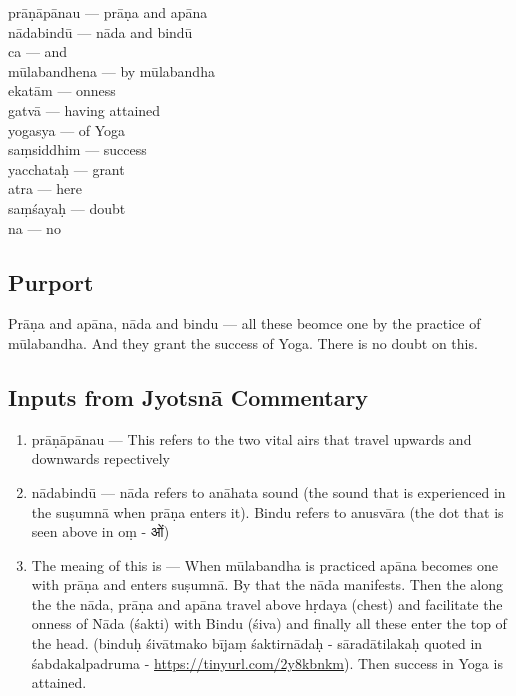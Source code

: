 \begin{multicols}{2}
prāṇāpānau ---  prāṇa and apāna \\
nādabindū --- nāda and bindū\\
ca --- and \\
mūlabandhena --- by mūlabandha \\
ekatām --- onness \\
gatvā --- having attained \\
yogasya --- of Yoga \\
saṃsiddhim --- success \\
yacchataḥ --- grant \\
atra --- here \\
saṃśayaḥ --- doubt \\
na --- no
\end{multicols}

\subsection*{Purport}

Prāṇa and apāna, nāda and bindu --- all these beomce one by the practice of mūlabandha. And they grant the success of Yoga. There is no doubt on this. 

\subsection*{Inputs from Jyotsnā Commentary}

\begin{enumerate}
\item prāṇāpānau --- This refers to the two vital airs that travel upwards and downwards repectively 
\item nādabindū --- nāda refers to anāhata sound (the sound that is experienced in the suṣumnā when prāṇa enters it). Bindu refers to anusvāra (the dot that is seen above in oṃ - ओं)
\item The meaing of this is --- When mūlabandha is practiced apāna becomes one with prāṇa and enters suṣumnā. By that the nāda manifests. Then the along the the nāda, prāṇa and apāna travel above hṛdaya (chest) and facilitate the onness of Nāda (śakti) with Bindu (śiva) and finally all these enter the top of the head. (binduḥ śivātmako bījaṃ śaktirnādaḥ - sāradātilakaḥ quoted in śabdakalpadruma - \url{https://tinyurl.com/2y8kbnkm}). Then success in Yoga is attained.  
\end{enumerate}


